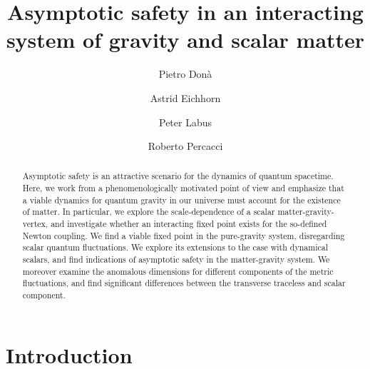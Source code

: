 \documentclass[twocolumn,prd,superscriptaddress,preprintnumbers,amsmath,amssymb,nofootinbib]{revtex4}
\begin{document}
\author{Pietro Don\`a}

\author{Astrid Eichhorn}

\author{Peter Labus}

\author{Roberto Percacci}




\title{Asymptotic safety in an interacting system of gravity and scalar matter}

\begin{abstract}
Asymptotic safety is an attractive scenario for the dynamics of quantum spacetime. Here, we work from a phenomenologically motivated point of view and emphasize that a viable dynamics for quantum gravity in our universe must account for the existence of matter. In particular, we explore the scale-dependence of a scalar matter-gravity-vertex, and investigate whether an interacting fixed point exists for the so-defined Newton coupling. We find a viable fixed point in the pure-gravity system, disregarding scalar quantum fluctuations. We explore its extensions to the case with dynamical scalars, and find indications of asymptotic safety in the matter-gravity system.
We moreover examine the anomalous dimensions for different components of the metric fluctuations, and find significant differences between the transverse traceless and  scalar component.
\end{abstract}

\maketitle

\section{Introduction}
%
\end{document}
